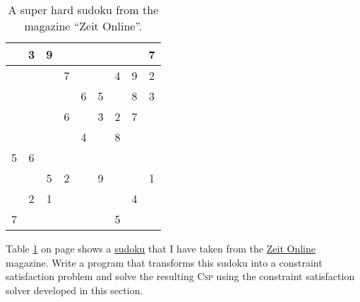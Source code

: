 \begin{table}
  \centering
  \begin{tabular}{||c|c|c||c|c|c||c|c|c||}
    \hline
    \hline
      & 3 & 9 &   &   &   &   &   & 7 \\
    \hline
      &   &   & 7 &   &   & 4 & 9 & 2 \\
    \hline
      &   &   &   & 6 & 5 &   & 8 & 3 \\
    \hline
    \hline
      &   &   & 6 &   & 3 & 2 & 7 &   \\
    \hline
      &   &   &   & 4 &   & 8 &   &   \\
    \hline
    5 & 6 &   &   &   &   &   &   &   \\
    \hline
    \hline
      &   & 5 & 2 &   & 9 &   &   & 1 \\
    \hline
      & 2 & 1 &   &   &   &   & 4 &   \\
    \hline
    7 &   &   &   &   &   & 5 &   &   \\
    \hline
    \hline
  \end{tabular}
  \caption{A super hard sudoku from the magazine ``Zeit Online''.}
  \label{tab:sudoku}
\end{table}

\exercise
Table \ref{tab:sudoku} on page \pageref{tab:sudoku} shows a \href{https://en.wikipedia.org/wiki/Sudoku}{sudoku}
that I have taken from the
\href{http://sudoku.zeit.de/cgi-bin/sudoku/sudoku_kd_app_2016.pl?action=level&kd_nr=24091123601092&year=2018&month=03&day=23&level=-c+5}{Zeit Online}
magazine.  Write a program that transforms this sudoku into a constraint satisfaction problem and solve the
resulting \textsc{Csp} using the constraint satisfaction solver developed in this section.
\eoxs

